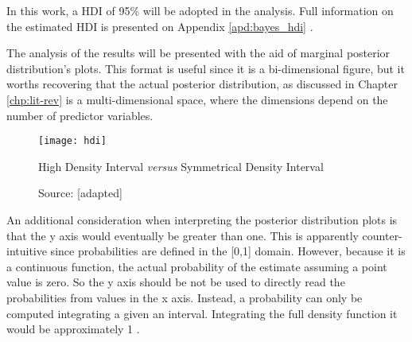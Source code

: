 In this work, a HDI of 95\% will be adopted in the analysis. Full information on the estimated HDI is presented on Appendix \ref{apd:bayes_hdi} .

The analysis of the results will be presented with the aid of marginal posterior distribution's plots. This format is useful since it is a bi-dimensional figure, but it worths recovering that the actual posterior distribution, as discussed in Chapter \ref{chp:lit-rev} is a multi-dimensional space, where the dimensions depend on the number of predictor variables.

\begin{figure}
\centering
\texttt{[image: hdi]}
\caption{High Density Interval \textit{versus} Symmetrical Density Interval}
\label{fig:hdi}
\caption*{Source: \cite{hdinterval} [adapted]}
\end{figure}


An additional consideration when interpreting the posterior distribution plots is that the y axis would eventually be greater than one. This is apparently counter-intuitive since probabilities are defined in the [0,1] domain. However, because it is a continuous function, the actual probability of the estimate assuming a point value is zero. So the y axis should be not be used to directly read the probabilities from values in the x axis. Instead, a probability can only be computed integrating a given an interval. Integrating the full density function it would be approximately 1 \citep{kruschke2014}.

